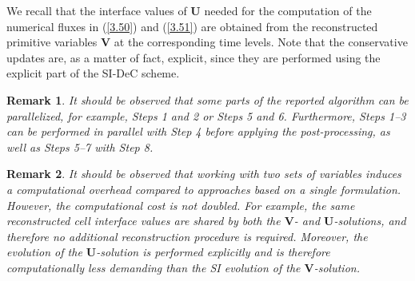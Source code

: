 \documentclass[A4paper,12pt,twoside]{article}
\newtheorem{remark}{Remark}[section]
\numberwithin{equation}{section}
\numberwithin{figure}{section}
\numberwithin{table}{section}
\newcommand\eref[1]{(\ref{#1})}
\begin{document}
We recall that the interface values of $\bm U$ needed for the computation of the numerical fluxes in \eref{3.50} and \eref{3.51} are
obtained from the reconstructed primitive variables $\bm V$ at the corresponding time levels. Note that the conservative updates are, as a
matter of fact, explicit, since they are performed using the explicit part of the SI-DeC scheme.

{\color{red}
\begin{remark}
It should be observed that some parts of the reported algorithm can be parallelized, for example, Steps 1 and 2 or Steps 5 and 6.
Furthermore, Steps 1--3 can be performed in parallel with Step 4 before applying the post-processing, as well as Steps 5--7 with Step 8.
\end{remark}}

{\color{blue}
\begin{remark}
It should be observed that working with two sets of variables induces a computational overhead compared to approaches based on a single
formulation. However, the computational cost is not doubled. For example, the same reconstructed cell interface values are shared by both
the $\bm V$- and $\bm U$-solutions, and therefore no additional reconstruction procedure is required. Moreover, the evolution of the
$\bm U$-solution is performed explicitly and is therefore computationally less demanding than the SI evolution of the $\bm V$-solution.
\end{remark}
}
\end{document}
